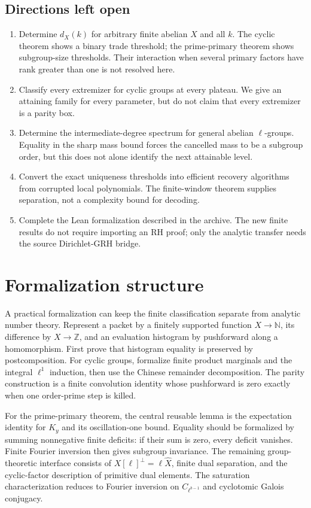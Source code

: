 \documentclass[11pt]{article}
\theoremstyle{definition}
\theoremstyle{remark}
\begin{document}
\subsection{Directions left open}
\begin{enumerate}
\item Determine $d_X(k)$ for arbitrary finite abelian $X$ and all $k$. The cyclic theorem shows a binary trade threshold; the prime-primary theorem shows subgroup-size thresholds. Their interaction when several primary factors have rank greater than one is not resolved here.
\item Classify every extremizer for cyclic groups at every plateau. We give an attaining family for every parameter, but do not claim that every extremizer is a parity box.
\item Determine the intermediate-degree spectrum for general abelian $\ell$-groups. Equality in the sharp mass bound forces the cancelled mass to be a subgroup order, but this does not alone identify the next attainable level.
\item Convert the exact uniqueness thresholds into efficient recovery algorithms from corrupted local polynomials. The finite-window theorem supplies separation, not a complexity bound for decoding.
\item Complete the Lean formalization described in the archive. The new finite results do not require importing an RH proof; only the analytic transfer needs the source Dirichlet-GRH bridge.
\end{enumerate}

\appendix
\section{Formalization structure}
A practical formalization can keep the finite classification separate from analytic number theory. Represent a packet by a finitely supported function $X\to\mathbb N$, its difference by $X\to\mathbb Z$, and an evaluation histogram by pushforward along a homomorphism. First prove that histogram equality is preserved by postcomposition. For cyclic groups, formalize finite product marginals and the integral $\ell^1$ induction, then use the Chinese remainder decomposition. The parity construction is a finite convolution identity whose pushforward is zero exactly when one order-prime step is killed.

For the prime-primary theorem, the central reusable lemma is the expectation identity for $K_y$ and its oscillation-one bound. Equality should be formalized by summing nonnegative finite deficits: if their sum is zero, every deficit vanishes. Finite Fourier inversion then gives subgroup invariance. The remaining group-theoretic interface consists of $X[\ell]^\perp=\ell\widehat X$, finite dual separation, and the cyclic-factor description of primitive dual elements. The saturation characterization reduces to Fourier inversion on $C_{\ell^{b-1}}$ and cyclotomic Galois conjugacy.
\end{document}
